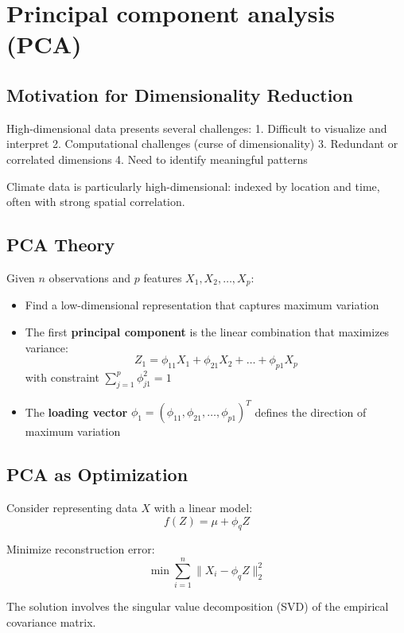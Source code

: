 \documentclass[
  letterpaper,
  DIV=11,
  numbers=noendperiod]{scrreprt}
\begin{document}
\section{Principal component analysis
(PCA)}\label{principal-component-analysis-pca}

\subsection{Motivation for Dimensionality
Reduction}\label{motivation-for-dimensionality-reduction}

High-dimensional data presents several challenges: 1. Difficult to
visualize and interpret 2. Computational challenges (curse of
dimensionality) 3. Redundant or correlated dimensions 4. Need to
identify meaningful patterns

Climate data is particularly high-dimensional: indexed by location and
time, often with strong spatial correlation.

\subsection{PCA Theory}\label{pca-theory}

Given \(n\) observations and \(p\) features \(X_1, X_2, \ldots, X_p\):

\begin{itemize}
\item
  Find a low-dimensional representation that captures maximum variation
\item
  The first \textbf{principal component} is the linear combination that
  maximizes variance:
  \[Z_1 = \phi_{11}X_1 + \phi_{21}X_2 + \ldots + \phi_{p1}X_p\] with
  constraint \(\sum_{j=1}^p \phi_{j1}^2 = 1\)
\item
  The \textbf{loading vector}
  \(\phi_1 = (\phi_{11}, \phi_{21}, \ldots, \phi_{p1})^T\) defines the
  direction of maximum variation
\end{itemize}

\subsection{PCA as Optimization}\label{pca-as-optimization}

Consider representing data \(X\) with a linear model: \[
f(Z) = \mu + \phi_q Z
\]

Minimize reconstruction error: \[
\min \sum_{i=1}^n \| X_i - \phi_q Z \|_2^2
\]

The solution involves the singular value decomposition (SVD) of the
empirical covariance matrix.
\end{document}
